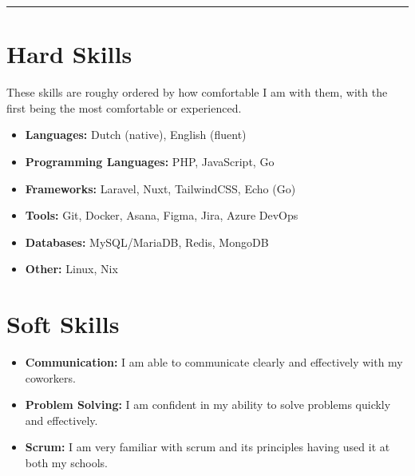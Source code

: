 \documentclass{article}
\begin{document}
\noindent\rule{\linewidth}{0.4pt}

\section*{Hard Skills}
These skills are roughy ordered by how comfortable I am with them, with the first being the most comfortable or experienced.
\begin{itemize}[noitemsep]
    \item \textbf{Languages:} Dutch (native), English (fluent)
    \item \textbf{Programming Languages:} PHP, JavaScript, Go
    \item \textbf{Frameworks:} Laravel, Nuxt, TailwindCSS, Echo (Go)
    \item \textbf{Tools:} Git, Docker, Asana, Figma, Jira, Azure DevOps
    \item \textbf{Databases:} MySQL/MariaDB, Redis, MongoDB
    \item \textbf{Other:} Linux, Nix
\end{itemize}

\section*{Soft Skills}
\begin{itemize}[noitemsep]
    \item \textbf{Communication:} I am able to communicate clearly and effectively with my coworkers.
    \item \textbf{Problem Solving:} I am confident in my ability to solve problems quickly and effectively.
    \item \textbf{Scrum:} I am very familiar with scrum and its principles having used it at both my schools.
\end{itemize}
\end{document}
